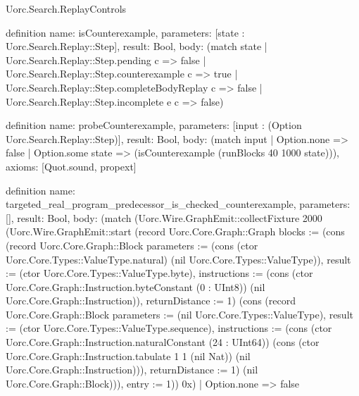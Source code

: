 \begin{lexlean}{Uorc.Search.ReplayControls}
\begin{semanticmodule}
definition{
  name: isCounterexample,
  parameters: [state : Uorc.Search.Replay::Step],
  result: Bool,
  body: (match state
    | Uorc.Search.Replay::Step.pending c => false
    | Uorc.Search.Replay::Step.counterexample c => true
    | Uorc.Search.Replay::Step.completeBodyReplay c => false
    | Uorc.Search.Replay::Step.incomplete e c => false)
}

definition{
  name: probeCounterexample,
  parameters: [input : (Option Uorc.Search.Replay::Step)],
  result: Bool,
  body: (match input
    | Option.none => false
    | Option.some state => (isCounterexample (runBlocks 40 1000 state))),
  axioms: [Quot.sound, propext]
}

definition{
  name: targeted_real_program_predecessor_is_checked_counterexample,
  parameters: [],
  result: Bool,
  body: (match (Uorc.Wire.GraphEmit::collectFixture 2000 (Uorc.Wire.GraphEmit::start (record Uorc.Core.Graph::Graph {blocks := (cons (record Uorc.Core.Graph::Block {parameters := (cons (ctor Uorc.Core.Types::ValueType.natural) (nil Uorc.Core.Types::ValueType)), result := (ctor Uorc.Core.Types::ValueType.byte), instructions := (cons (ctor Uorc.Core.Graph::Instruction.byteConstant (0 : UInt8)) (nil Uorc.Core.Graph::Instruction)), returnDistance := 1}) (cons (record Uorc.Core.Graph::Block {parameters := (nil Uorc.Core.Types::ValueType), result := (ctor Uorc.Core.Types::ValueType.sequence), instructions := (cons (ctor Uorc.Core.Graph::Instruction.naturalConstant (24 : UInt64)) (cons (ctor Uorc.Core.Graph::Instruction.tabulate 1 1 (nil Nat)) (nil Uorc.Core.Graph::Instruction))), returnDistance := 1}) (nil Uorc.Core.Graph::Block))), entry := 1})) 0x)
    | Option.none => false
}
\end{semanticmodule}
\end{lexlean}
